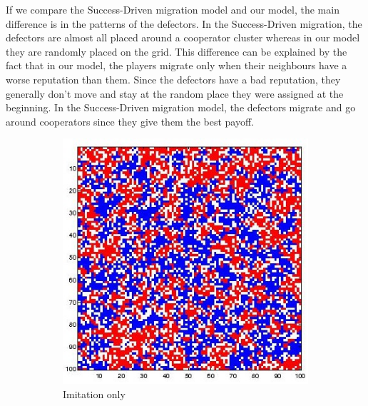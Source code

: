 \documentclass[11pt]{article}
\begin{document}
If we compare the Success-Driven migration model and our model, the main difference is in the patterns of the defectors. In the Success-Driven migration, the defectors are almost all placed around a cooperator cluster whereas in our model they are randomly placed on the grid. This difference can be explained by the fact that in our model, the players migrate only when their neighbours have a worse reputation than them. Since the defectors have a bad reputation, they generally don't move and stay at the random place they were assigned at the beginning. In the Success-Driven migration model, the defectors migrate and go around cooperators since they give them the best payoff.


\begin{figure}[H]
	\centering
	\begin{subfigure}[t]{0.26\textwidth}
        \includegraphics[width=\textwidth]{../../other/grids/m0-t200-a5-g300.jpg}
	\caption{Imitation only}
	\label{fig:grids_imitation0}
    	\end{subfigure}
	\begin{subfigure}[t]{0.26\textwidth}

\end{subfigure}
\end{figure}
\end{document}
